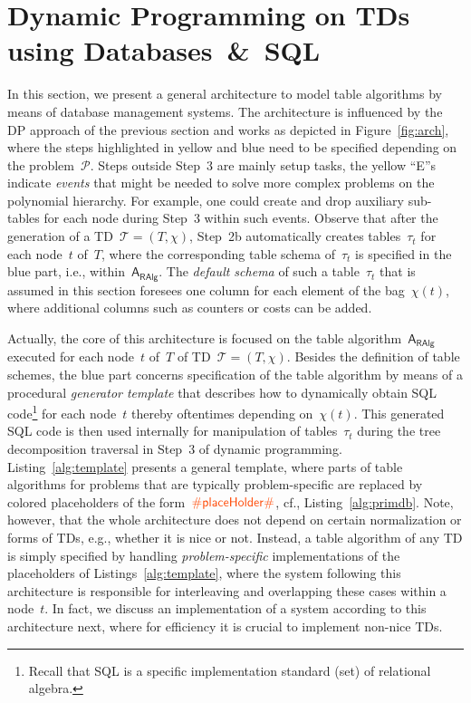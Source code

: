 \documentclass{llncs}
\newcommand{\inputPredColor}{orange!55!red}
\newcommand{\algo}[1]{\ensuremath{\mathsf{#1}}}
\newcommand{\tab}[1]{\ensuremath{\tau_{#1}}}
\begin{document}
\section{Dynamic Programming on TDs using Databases~\&~SQL}
%
%
%
%
In this section, we present a general architecture to model table algorithms
by means of database management systems.
The architecture is influenced by the DP approach of the previous section
and works as depicted in Figure~\ref{fig:arch},
where the steps highlighted in yellow and blue need to be specified
depending on the problem~$\mathcal{P}$. Steps outside Step~3 are mainly setup tasks,
the yellow ``E''s indicate \emph{events} that might be needed to solve more complex problems
on the polynomial hierarchy. 
For example, one could create and drop auxiliary sub-tables for each node during Step~3 within such events.
Observe that after the generation of a TD~$\mathcal{T}=(T,\chi)$, 
Step~2b automatically creates tables~$\tab{t}$ for each node~$t$ of~$T$,
where the corresponding table schema of~$\tab{t}$ is specified in the blue part, i.e., 
within~$\algo{A_{RAlg}}$. 
The \emph{default schema} of such a table~$\tab{t}$ that is assumed in this section foresees one column for each element of the bag~$\chi(t)$, where additional columns such as counters or costs can be added.

Actually, the core of this architecture is focused on the table algorithm~$\algo{A_{RAlg}}$ executed for each node~$t$ of~$T$ of TD~$\mathcal{T}=(T,\chi)$. 
Besides the definition of table schemes, the blue part concerns specification of the table algorithm by means of a procedural \emph{generator template} that describes 
how to dynamically obtain SQL code\footnote{Recall that SQL is a specific implementation standard (set) of relational algebra.} for each node~$t$ thereby oftentimes depending on~$\chi(t)$.
This generated SQL code is then used internally for manipulation of 
tables~$\tab{t}$ during the tree decomposition 
traversal in Step~3 of dynamic programming.
%
Listing~\ref{alg:template} presents a general template, where parts of table algorithms for problems that are typically problem-specific are replaced by colored placeholders of the form~$\textcolor{\inputPredColor}{\#\mathsf{placeHolder}\#}$, cf., Listing~\ref{alg:primdb}.
Note, however, that the whole architecture does not depend 
on certain normalization or forms of TDs, e.g., whether it is nice or not.
Instead, a table algorithm of any TD is simply specified by 
handling \emph{problem-specific} implementations of the placeholders of Listings~\ref{alg:template}, where the system following this architecture is responsible for interleaving and overlapping these cases within a node~$t$.
In fact, we discuss an implementation of a system according to this architecture next, where for efficiency it is crucial to implement non-nice TDs.
\end{document}
